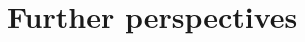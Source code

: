 \documentclass[../Thesis.tex]{subfiles}
\begin{document}
\section{Further perspectives}
\end{document}
